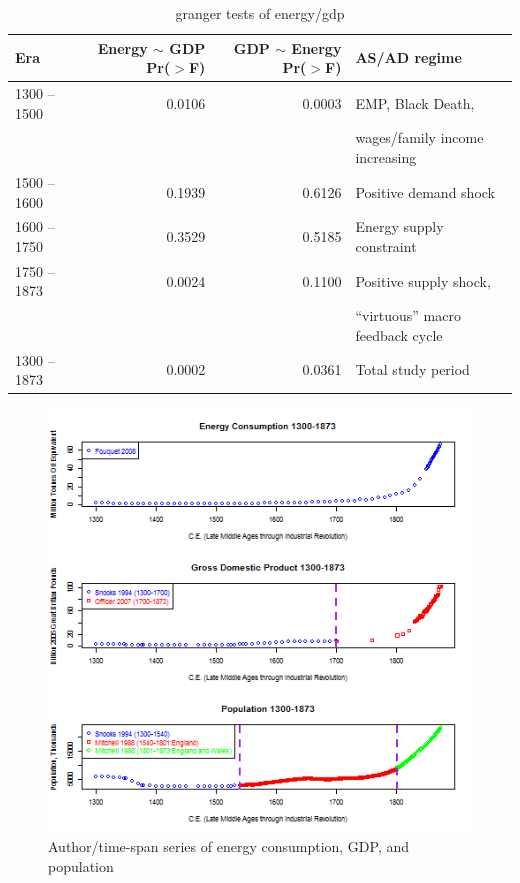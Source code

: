 \documentclass[final]{beamer}
\begin{document}
\begin{frame}
\scriptsize{
\begin{table}[p!]
\caption{granger tests of energy/gdp}
\label{tbl:grangerEnergyGdp}
\begin{tabular}{lrrl}
Era&Energy $\sim$ GDP Pr($>$F)& GDP $\sim$ Energy Pr($>$F)&AS/AD regime\\
\hline
1300 -- 1500&0.0106&0.0003&EMP, Black Death, \\&&&wages/family income increasing\\
1500 -- 1600&0.1939&0.6126&Positive demand shock\\
1600 -- 1750&0.3529&0.5185&Energy supply constraint\\
1750 -- 1873&0.0024&0.1100&Positive supply shock,\\&&&``virtuous'' macro feedback cycle\\
\hline
1300 -- 1873& 0.0002& 0.0361&Total study period\\
\end{tabular}
\end{table}
}
\end{frame}

\begin{frame}
\begin{figure}[p!]
\center
\caption{Author/time-span series of energy consumption, GDP, and population}
\label{fig:overall levels}
\includegraphics[height=0.8\textheight]{overallLevels}
\end{figure}
\end{frame}
\end{document}
